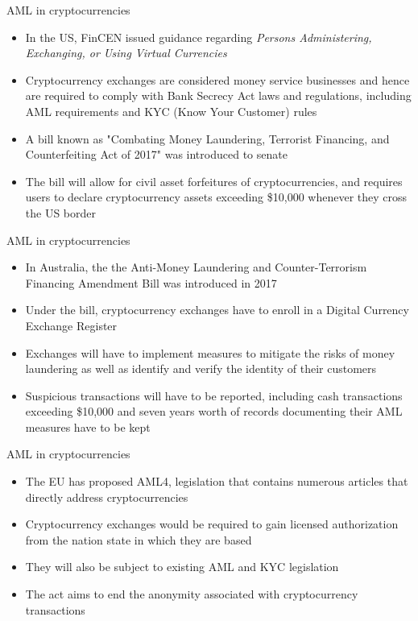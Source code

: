 \documentclass[10pt]{beamer}
\begin{document}
\begin{frame}{AML in cryptocurrencies}
	\begin{itemize}
		\item In the US, FinCEN issued guidance regarding \textit{Persons Administering, Exchanging, or Using Virtual Currencies}
		\item Cryptocurrency exchanges are considered money service businesses and hence are required to comply with Bank Secrecy Act laws and regulations, including AML requirements and KYC (Know Your Customer) rules
		\item A bill known as "Combating Money Laundering, Terrorist Financing, and Counterfeiting Act of 2017" was introduced to senate
		\item The bill will allow for civil asset forfeitures of cryptocurrencies, and requires users to declare cryptocurrency assets exceeding \$10,000 whenever they cross the US border
	\end{itemize}
\end{frame}


\begin{frame}{AML in cryptocurrencies}
	\begin{itemize}
		\item In Australia, the the Anti-Money Laundering and Counter-Terrorism Financing Amendment Bill was introduced in 2017
		\item Under the bill, cryptocurrency exchanges have to enroll in a Digital Currency Exchange Register
		\item Exchanges will have to implement measures to mitigate the risks of money laundering as well as identify and verify the identity of their customers
		\item Suspicious transactions will have to be reported, including cash transactions exceeding \$10,000 and seven years worth of records documenting their AML measures have to be kept
	\end{itemize}
\end{frame}


\begin{frame}{AML in cryptocurrencies}
	\begin{itemize}
		\item The EU has proposed AML4, legislation that contains numerous articles that directly address cryptocurrencies
		\item Cryptocurrency exchanges would be required to gain licensed authorization from the nation state in which they are based
		\item They will also be subject to existing AML and KYC legislation
		\item The act aims to end the anonymity associated with cryptocurrency transactions
	\end{itemize}
\end{frame}
\end{document}
